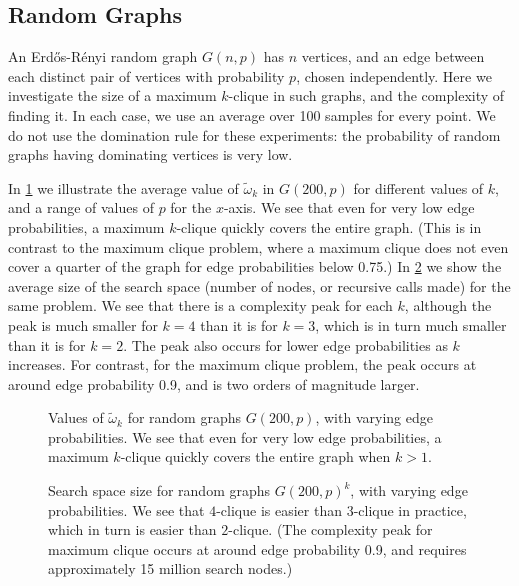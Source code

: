 \documentclass[letterpaper]{article}
\begin{document}
\subsection{Random Graphs}

An Erd\H{o}s-R\'{e}nyi random graph $G(n, p)$ has $n$ vertices, and an edge between each distinct
pair of vertices with probability $p$, chosen independently. Here we investigate the size of a
maximum $k$-clique in such graphs, and the complexity of finding it. In each case, we use an average
over 100 samples for every point.  We do not use the domination rule for these experiments: the
probability of random graphs having dominating vertices is very low.

In \cref{figure:graph-omega} we illustrate the average value of $\tilde{\omega}_k$ in $G(200,
p)$ for different values of $k$, and a range of values of $p$ for the $x$-axis. We see that even for
very low edge probabilities, a maximum $k$-clique quickly covers the entire graph.  (This is in contrast to
the maximum clique problem, where a maximum clique does not even cover a quarter of the graph for
edge probabilities below 0.75.) In \cref{figure:graph-nodes} we show the average size of the
search space (number of nodes, or recursive calls made) for the same problem. We see that there is a
complexity peak for each $k$, although the peak is much smaller for $k = 4$ than it is for $k = 3$,
which is in turn much smaller than it is for $k = 2$. The peak also occurs for lower edge
probabilities as $k$ increases. For contrast, for the maximum clique problem, the peak occurs at
around edge probability 0.9, and is two orders of magnitude larger.

\begin{figure}[t]
    \centering
    
    \caption{Values of $\tilde{\omega}_k$ for random graphs $G(200, p)$, with varying edge probabilities.
        We see that even for very low edge probabilities, a maximum $k$-clique
    quickly covers the entire graph when $k > 1$.}
    \label{figure:graph-omega}
\end{figure}

\begin{figure}[t]
    \centering
    
    \caption{Search space size for random graphs $G(200, p)^k$, with varying edge probabilities. We see that
        $4$-clique is easier than $3$-clique in practice, which in turn is easier than $2$-clique. (The
        complexity peak for maximum clique occurs at around edge probability 0.9, and requires
        approximately 15 million search nodes.)}
    \label{figure:graph-nodes}
\end{figure}
\end{document}

